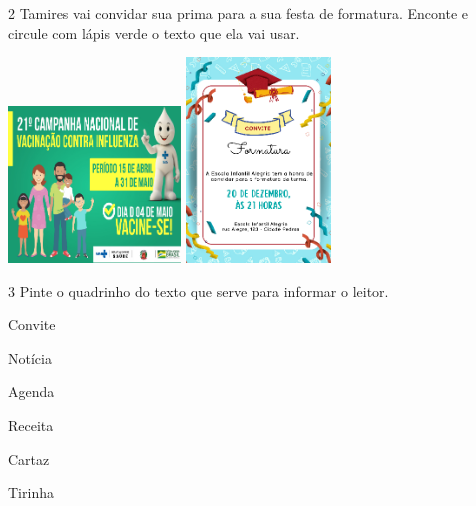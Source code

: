 

\num{2} Tamires vai convidar sua prima para a sua festa de formatura. 
Enconte e circule com lápis verde o texto que ela vai usar. 


\includegraphics[width=1.80556in,height=1.63403in]{media/image100.png}
\includegraphics[width=1.51458in,height=2.14444in]{media/image103.png}


\num{3} Pinte o quadrinho do texto que serve para informar o leitor.


\begin{boxlist}
 Convite

 Notícia

 Agenda 

 Receita

 Cartaz 

 Tirinha
\end{boxlist}

